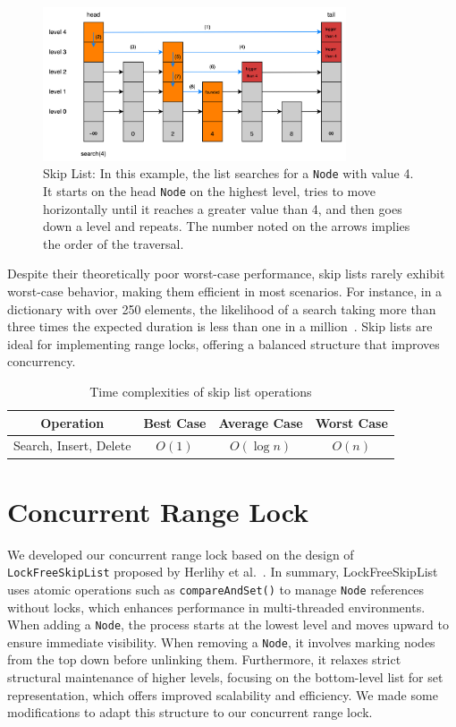 \begin{figure}[h]
    \centering
    \includegraphics[width=0.8\textwidth]{./figures/skiplistsearch.jpg}
    \caption{Skip List: In this example, the list searches for a \texttt{Node} with value 4. It starts on the head \texttt{Node} on the highest level, tries to move horizontally until it reaches a greater value than 4, and then goes down a level and repeats. The number noted on the arrows implies the order of the traversal.}
    \label{fig:skiplistsearch}
\end{figure}

Despite their theoretically poor worst-case performance, skip lists rarely exhibit worst-case behavior, making them efficient in most scenarios. For instance, in a dictionary with over 250 elements, the likelihood of a search taking more than three times the expected duration is less than one in a million~\parencite{pugh1990skip2}. Skip lists are ideal for implementing range locks, offering a balanced structure that improves concurrency.


\begin{table}[h!]
    \centering
    \begin{tabular}{|c|c|c|c|}
        \hline
        \textbf{Operation} & \textbf{Best Case} & \textbf{Average Case} & \textbf{Worst Case} \\ \hline
 Search, Insert, Delete & $O(1)$ & $O(\log n)$ & $O(n)$ \\ \hline
    \end{tabular}
    \caption{Time complexities of skip list operations}
    \label{table:skiplisttimecomplexity}
\end{table}

\newpage

\section{Concurrent Range Lock}
We developed our concurrent range lock based on the design of \texttt{LockFreeSkipList} proposed by Herlihy et al.~\parencite{herlihy2020art}. In summary, LockFreeSkipList uses atomic operations such as \texttt{compareAndSet()} to manage \texttt{Node} references without locks, which enhances performance in multi-threaded environments. When adding a \texttt{Node}, the process starts at the lowest level and moves upward to ensure immediate visibility. When removing a \texttt{Node}, it involves marking nodes from the top down before unlinking them. Furthermore, it relaxes strict structural maintenance of higher levels, focusing on the bottom-level list for set representation, which offers improved scalability and efficiency. We made some modifications to adapt this structure to our concurrent range lock.

